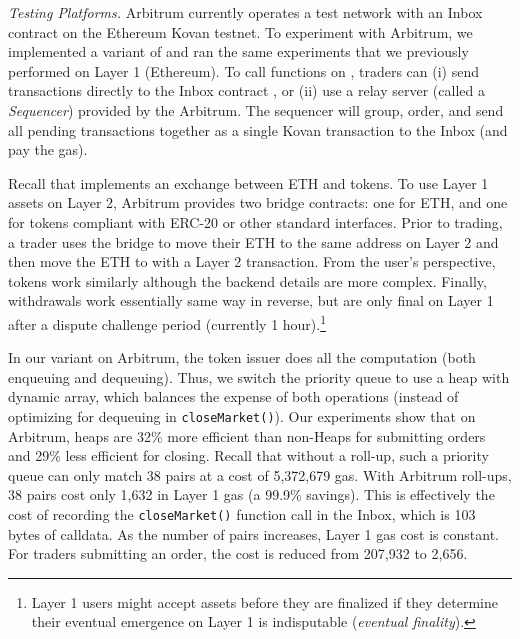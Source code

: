 \textit{Testing Platforms.} Arbitrum currently operates a test network with an Inbox contract on the Ethereum Kovan testnet. To experiment with Arbitrum, we implemented a variant of \cm and ran the same experiments that we previously performed on Layer 1 (Ethereum). To call functions on \cm, traders can (i) send transactions directly to the Inbox contract \href{https://kovan.etherscan.io/address/0x76bF1345224fE606E2aB38B8E52B83512328A9DF}, or (ii) use a relay server (called a \textit{Sequencer}) provided by the Arbitrum. The sequencer will group, order,  and send all pending transactions together as a single Kovan transaction to the Inbox (and pay the gas). 

Recall that \cm implements an exchange between ETH and tokens. To use Layer 1 assets on Layer 2, Arbitrum provides two bridge contracts: one for ETH, and one for tokens compliant with ERC-20 or other standard interfaces. Prior to trading, a trader uses the bridge to move their ETH to the same address on Layer 2 and then move the ETH to \cm with a Layer 2 transaction. From the user's perspective, tokens work similarly although the backend details are more complex. Finally, withdrawals work essentially same way in reverse, but are only final on Layer 1 after a dispute challenge period (currently 1 hour).\footnote{Layer 1 users might accept assets before they are finalized if they determine their eventual emergence on Layer 1 is indisputable (\textit{eventual finality}).}  

%


  
In our \cm variant on Arbitrum, the token issuer does all the computation (both enqueuing and dequeuing). Thus, we switch the priority queue to use a heap with dynamic array, which balances the expense of both operations (instead of optimizing for dequeuing in \texttt{closeMarket()}). Our experiments show that on Arbitrum, heaps are 32\% more efficient than non-Heaps for submitting orders and 29\% less efficient for closing. Recall that without a roll-up, such a priority queue can only match 38 pairs at a cost of 5,372,679 gas. With Arbitrum roll-ups, 38 pairs cost only 1,632 in Layer 1 gas (a 99.9\% savings). This is effectively the cost of recording the \texttt{closeMarket()} function call in the Inbox, which is 103 bytes of calldata. As the number of pairs increases, Layer 1 gas cost is constant. For traders submitting an order, the cost is reduced from  207,932 to 2,656. 
 
